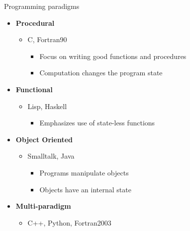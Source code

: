 \documentclass[11pt]{beamer}
\newcommand{\bi}{\begin{itemize}}
\newcommand{\ei}{\end{itemize}}
\begin{document}
\begin{frame}{Programming paradigms}
\bi
\item \textbf{Procedural}
	\bi
	\item C, Fortran90 
	\bi
		\item Focus on writing good functions and procedures %
		\item Computation changes the program state
	\ei
	\ei
\item \textbf{Functional}
	\bi
	\item Lisp, Haskell
	\bi
		\item Emphasizes use of state-less functions %
	\ei
	\ei
\item \textbf{Object Oriented}
	\bi
	\item Smalltalk, Java
	\bi
		\item Programs manipulate objects
		\item Objects have an internal state
	\ei
	\ei
 \item \textbf{Multi-paradigm}
	\bi
	\item C++, Python, Fortran2003
	\ei

 \end{itemize}

\end{frame}

\end{document}
